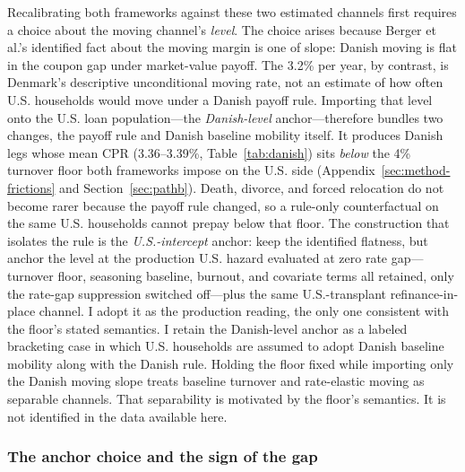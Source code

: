 \documentclass[12pt]{article}
\begin{document}
Recalibrating both frameworks against these two estimated channels first requires a choice about the moving channel's \emph{level}. The choice arises because Berger et al.'s identified fact about the moving margin is one of slope: Danish moving is flat in the coupon gap under market-value payoff. The 3.2\% per year, by contrast, is Denmark's descriptive unconditional moving rate, not an estimate of how often U.S. households would move under a Danish payoff rule. Importing that level onto the U.S. loan population---the \emph{Danish-level} anchor---therefore bundles two changes, the payoff rule and Danish baseline mobility itself. It produces Danish legs whose mean CPR (3.36--3.39\%, Table~\ref{tab:danish}) sits \emph{below} the 4\% turnover floor both frameworks impose on the U.S. side (Appendix~\ref{sec:method-frictions} and Section~\ref{sec:pathb}). Death, divorce, and forced relocation do not become rarer because the payoff rule changed, so a rule-only counterfactual on the same U.S. households cannot prepay below that floor. The construction that isolates the rule is the \emph{U.S.-intercept} anchor: keep the identified flatness, but anchor the level at the production U.S. hazard evaluated at zero rate gap---turnover floor, seasoning baseline, burnout, and covariate terms all retained, only the rate-gap suppression switched off---plus the same U.S.-transplant refinance-in-place channel. I adopt it as the production reading, the only one consistent with the floor's stated semantics. I retain the Danish-level anchor as a labeled bracketing case in which U.S. households are assumed to adopt Danish baseline mobility along with the Danish rule. Holding the floor fixed while importing only the Danish moving slope treats baseline turnover and rate-elastic moving as separable channels. That separability is motivated by the floor's semantics. It is not identified in the data available here.

\subsubsection{The anchor choice and the sign of the gap}
\end{document}
